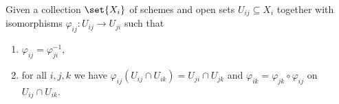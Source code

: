 Given a collection $\set{X_i}$ of schemes and open sets $U_{ij} \subseteq X_i$
together with isomorphisms $\varphi_{ij}\colon U_{ij}\to U_{ji}$ such that
\begin{enumerate}
	\item $\varphi_{ij} = \varphi_{ji}^{-1}$,
	\item for all $i, j, k$ we have $\varphi_{ij}(U_{ij}\cap U_{ik}) = U_{ji}\cap U_{jk}$ and
		$\varphi_{ik} = \varphi_{jk} \circ \varphi_{ij}$ on $U_{ij}\cap U_{ik}$.
\end{enumerate}
